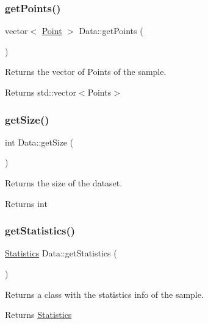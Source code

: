 \subsubsection{\texorpdfstring{get\+Points()}{getPoints()}}
{\footnotesize\ttfamily vector$<$ \hyperlink{class_point}{Point} $>$ Data\+::get\+Points (\begin{DoxyParamCaption}{ }\end{DoxyParamCaption})}



Returns the vector of Points of the sample. 

\begin{DoxyReturn}{Returns}
std\+::vector$<$\+Points$>$ 
\end{DoxyReturn}
\mbox{\label{class_data_abfd7c7cca66a186ff45efa430bcb2f1e}} 
\subsubsection{\texorpdfstring{get\+Size()}{getSize()}}
{\footnotesize\ttfamily int Data\+::get\+Size (\begin{DoxyParamCaption}{ }\end{DoxyParamCaption})}



Returns the size of the dataset. 

\begin{DoxyReturn}{Returns}
int 
\end{DoxyReturn}
\mbox{\label{class_data_a26376768a100f1999ef3ac15a2aa2a67}} 
\subsubsection{\texorpdfstring{get\+Statistics()}{getStatistics()}}
{\footnotesize\ttfamily \hyperlink{class_statistics}{Statistics} Data\+::get\+Statistics (\begin{DoxyParamCaption}{ }\end{DoxyParamCaption})}



Returns a class with the statistics info of the sample. 

\begin{DoxyReturn}{Returns}
\hyperlink{class_statistics}{Statistics} 
\end{DoxyReturn}
\mbox{\label{class_data_a90e4e972afe7cfd622d4935299def743}} 

